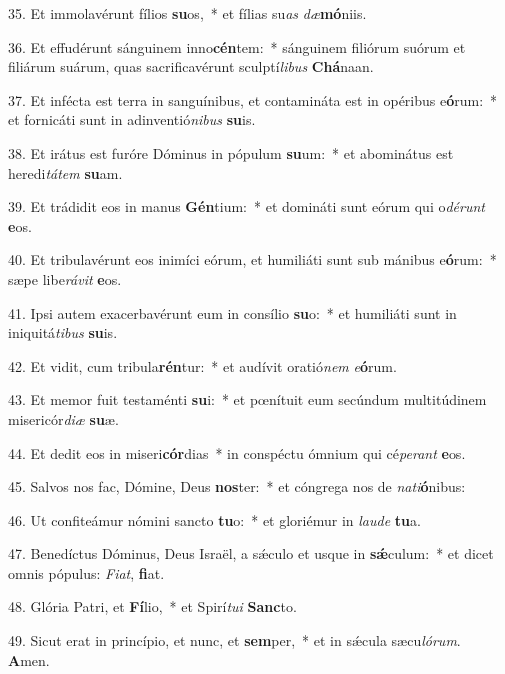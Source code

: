 35. Et immolavérunt fílios \textbf{su}os,~*  et fílias su\textit{as} \textit{dæ}\textbf{mó}niis.\

36. Et effudérunt sánguinem inno\textbf{cén}tem:~*  sánguinem filiórum suórum et filiárum suárum, quas sacrificavérunt sculptí\textit{li}\textit{bus} \textbf{Chá}naan.\

37. Et infécta est terra in sanguínibus, et contamináta est in opéribus e\textbf{ó}rum:~*  et fornicáti sunt in adinventió\textit{ni}\textit{bus} \textbf{su}is.\

38. Et irátus est furóre Dóminus in pópulum \textbf{su}um:~*  et abominátus est heredi\textit{tá}\textit{tem} \textbf{su}am.\

39. Et trádidit eos in manus \textbf{Gén}tium:~*  et domináti sunt eórum qui o\textit{dé}\textit{runt} \textbf{e}os.\

40. Et tribulavérunt eos inimíci eórum, et humiliáti sunt sub mánibus e\textbf{ó}rum:~*  sæpe libe\textit{rá}\textit{vit} \textbf{e}os.\

41. Ipsi autem exacerbavérunt eum in consílio \textbf{su}o:~*  et humiliáti sunt in iniquitá\textit{ti}\textit{bus} \textbf{su}is.\

42. Et vidit, cum tribula\textbf{rén}tur:~*  et audívit oratió\textit{nem} \textit{e}\textbf{ó}rum.\

43. Et memor fuit testaménti \textbf{su}i:~*  et pœnítuit eum secúndum multitúdinem misericór\textit{di}\textit{æ} \textbf{su}æ.\

44. Et dedit eos in miseri\textbf{cór}dias~*  in conspéctu ómnium qui cé\textit{pe}\textit{rant} \textbf{e}os.\

45. Salvos nos fac, Dómine, Deus \textbf{nos}ter:~*  et cóngrega nos de \textit{na}\textit{ti}\textbf{ó}nibus:\

46. Ut confiteámur nómini sancto \textbf{tu}o:~*  et gloriémur in \textit{lau}\textit{de} \textbf{tu}a.\

47. Benedíctus Dóminus, Deus Israël, a sǽculo et usque in \textbf{sǽ}culum:~*  et dicet omnis pópulus: \textit{Fi}\textit{at}, \textbf{fi}at.\

48. Glória Patri, et \textbf{Fí}lio,~*  et Spirí\textit{tu}\textit{i} \textbf{Sanc}to.\

49. Sicut erat in princípio, et nunc, et \textbf{sem}per,~*  et in sǽcula sæcu\textit{ló}\textit{rum}. \textbf{A}men.\

